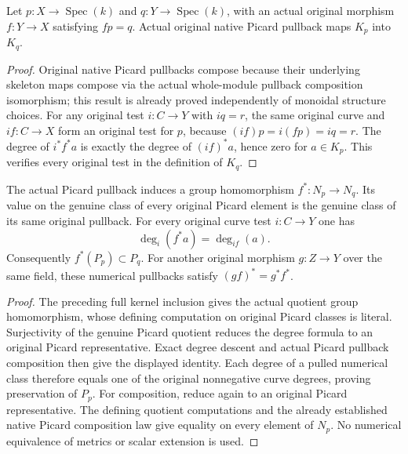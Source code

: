 \begin{theorem}
\label{thm:seven-native-numerical-pullback-kernel}
\leanok
{}
Let $p:X\to\operatorname{Spec}(k)$ and
$q:Y\to\operatorname{Spec}(k)$, with an actual original morphism
$f:Y\to X$ satisfying $fp=q$. Actual original native Picard pullback
maps $K_p$ into $K_q$.
\end{theorem}
\begin{proof}
Original native Picard pullbacks compose because their underlying
skeleton maps compose via the actual whole-module pullback composition
isomorphism; this result is already proved independently of monoidal
structure choices. For any original test $i:C\to Y$ with $iq=r$, the
same original curve and $if:C\to X$ form an original test for $p$,
because $(if)p=i(fp)=iq=r$. The degree of $i^*f^*a$ is exactly the
degree of $(if)^*a$, hence zero for $a\in K_p$. This verifies every
original test in the definition of $K_q$.
\end{proof}

\begin{theorem}
\label{thm:seven-native-numerical-pullback}
\leanok
{}
The actual Picard pullback induces a group homomorphism
$f^*:N_p\to N_q$. Its value on the genuine class of every original
Picard element is the genuine class of its same original pullback.
For every original curve test $i:C\to Y$ one has
\[
 \deg_i(f^*a)=\deg_{if}(a).
\]
Consequently $f^*(P_p)\subset P_q$. For another original morphism
$g:Z\to Y$ over the same field, these numerical pullbacks satisfy
$(gf)^*=g^*f^*$.
\end{theorem}
\begin{proof}
The preceding full kernel inclusion gives the actual quotient group
homomorphism, whose defining computation on original Picard classes is
literal. Surjectivity of the genuine Picard quotient reduces the degree
formula to an original Picard representative. Exact degree descent and
actual Picard pullback composition then give the displayed identity.
Each degree of a pulled numerical class therefore equals one of the
original nonnegative curve degrees, proving preservation of $P_p$.
For composition, reduce again to an original Picard representative.
The defining quotient computations and the already established native
Picard composition law give equality on every element of $N_p$.
No numerical equivalence of metrics or scalar extension is used.
\end{proof}
